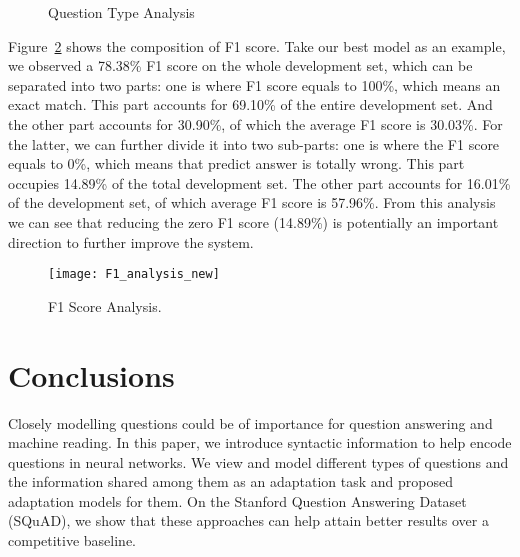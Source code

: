 \documentclass{article}
\begin{document}
\begin{figure}[h!]
 \centering
 \caption{Question Type Analysis}
 \label{fig:subfig} \end{figure}


Figure~\ref{fig:result1} shows the composition of F1 score. Take our best model as an example, we observed a 78.38\% F1 score on the whole development set, which can be separated into two parts: one is where F1 score equals to 100\%, which means an exact match. This part accounts for 69.10\% of the entire development set. And the other part accounts for 30.90\%, of which the average F1 score is 30.03\%. For the latter, we can further divide it into two sub-parts: one is where the F1 score equals to 0\%, which means that predict answer is totally wrong. This part occupies 14.89\% of the total development set. The other part accounts for 16.01\% of the development set, of which average F1 score is 57.96\%. From this analysis we can see that reducing the zero F1 score (14.89\%) is potentially an important direction to further improve the system.

\begin{figure}[h!]
	\centering
	\texttt{[image: F1\_analysis\_new]}
	\caption{F1 Score Analysis.}
	\label{fig:result1}
\end{figure}


\section{Conclusions}
Closely modelling questions could be of importance for question answering and machine reading.  In this paper, we introduce syntactic information to help encode questions in neural networks. We view and model different types of questions and the information shared among them as an adaptation task and proposed adaptation models for them. On the Stanford Question Answering Dataset (SQuAD), we show that these approaches can help attain better results over a competitive baseline.  





\end{document}

